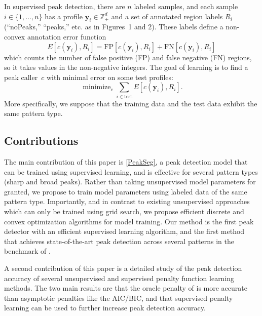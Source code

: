 \documentclass{article}
\DeclareMathOperator*{\minimize}{minimize}
\newcommand{\ZZ}{\mathbb Z}
\begin{document}
In supervised peak detection, there are $n$ labeled samples, and each
sample $i\in\{1, \dots, n\}$ has a profile $\mathbf y_i\in\ZZ_+^d$ and
a set of annotated region labels $R_i$ (``noPeaks,'' ``peaks,''
etc. as in Figures~1 and 2). These labels define a non-convex
annotation error function
\begin{equation}
  \label{eq:error}
  E[c(\mathbf y_i),  R_i] =
  \text{FP}[c(\mathbf y_i), R_i] +
  \text{FN}[c(\mathbf y_i), R_i]
\end{equation}
which counts the number of false positive (FP) and false negative (FN)
regions, so it takes values in the non-negative integers. The goal of
learning is to find a peak caller~$c$ with minimal error on some test
profiles:
\begin{equation}
  \label{eq:min_error}
  \minimize_c \sum_{i\in\text{test}} E[c(\mathbf y_i),  R_i].
\end{equation}
More specifically, we suppose that the training data and the test data
exhibit the same pattern type.


\subsection{Contributions 
}

The main contribution of this paper is \ref{PeakSeg}, a peak detection
model that can be trained using supervised learning, and is effective
for several pattern types (sharp and broad peaks). Rather than taking
unsupervised model parameters for granted, we propose to train model
parameters using labeled data of the same pattern type. Importantly,
and in contrast to existing unsupervised approaches which can only be
trained using grid search, we propose efficient discrete and convex
optimization algorithms for model training. Our method is the first
peak detector with an efficient supervised learning algorithm, and the
first method that achieves state-of-the-art peak detection across
several patterns in the benchmark of \citet{hocking2014visual}.

A second contribution of this paper is a detailed study of the peak
detection accuracy of several unsupervised and supervised penalty
function learning methods. The two main results are that the oracle
penalty of \citet{cleynen2013segmentation} is more accurate than
asymptotic penalties like the AIC/BIC, and that supervised penalty
learning can be used to further increase peak detection accuracy.

\end{document}

